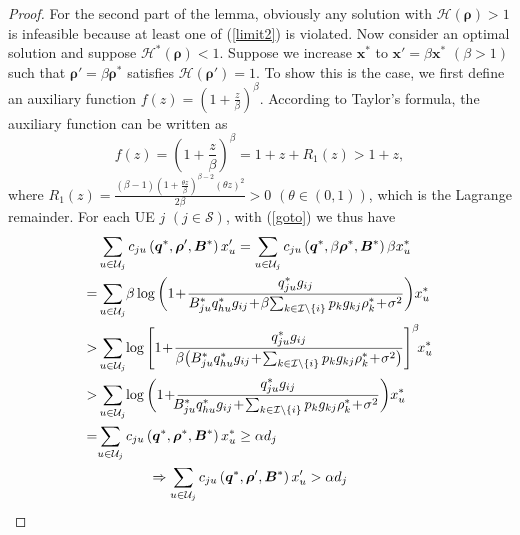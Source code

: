 \documentclass[10pt,journal,final,finalsubmission,twocolumn]{IEEEtran}
\begin{document}
\begin{proof}
For the second part of the lemma, obviously any solution with $\mathcal{H}(\boldsymbol{\rho}) > 1$ is infeasible because at least one of (\ref{limit2}) is violated. Now consider an optimal solution and suppose $\mathcal{H^*}(\boldsymbol{\rho}) < 1$. Suppose we increase $\boldsymbol{x}^*$ to $\boldsymbol{x}' =\beta\boldsymbol{x}^*$ $(\beta >1)$ such that $\boldsymbol{\rho}' =\beta\boldsymbol{\rho}^*$ satisfies $\mathcal{H}(\boldsymbol{\rho}') =1$. To show this is the case, we first define an auxiliary function $f(z) = (1+\frac{z}{\beta})^\beta$. According to Taylor's formula, the auxiliary function can be written as
\begin{equation}\label{goto}
f(z) =(1+\frac{z}{\beta})^\beta=1+z+R_1(z)>1+z,
\end{equation}
where $R_1(z)=\frac {(\beta-1)(1+\frac{\theta z}{\beta})^{\beta-2}(\theta z)^2}{2\beta}>0$ $(\theta \in (0,1))$, which is the Lagrange remainder. For each UE $j$ $(j\in \mathcal{S})$, with (\ref{goto}) we thus have
\begin{align}
&\sum\limits_{u\in \mathcal{U}_j} c_{ju}\left (\boldsymbol{q}^*,\boldsymbol{ \rho}', \boldsymbol{B}^*\right ) x_u'=\sum\limits_{u\in \mathcal{U}_j} c_{ju}\left (\boldsymbol{q}^*,\beta\boldsymbol{ \rho}^*, \boldsymbol{B}^*\right ) \beta x_u^*\notag\\
=&\sum\limits_{u\in \mathcal{U}_j}\!\beta\log \bigg ( 1\!+\!\frac{q_{ju}^*g_{ij}}{{B_{ju}^*q_{hu}^*g_{ij}}\!+\!\beta{\sum\nolimits_{ k\in \mathcal{I}\setminus \left \{ i \right \}}p_kg_{kj}\rho_k^*}\!+\!\sigma ^2} \bigg ) x_u^*\notag\\
>& \sum\limits_{u\in \mathcal{U}_j}\!\log \Bigg [ 1\!+\!\frac{q_{ju}^*g_{ij}}{\beta\big({B_{ju}^*q_{hu}^*g_{ij}}\!+\!{\sum\nolimits_{k\in \mathcal{I}\setminus \left \{ i \right \}}p_kg_{kj}\rho_k^*}\!+\!\sigma ^2\big)} \Bigg ]^\beta \!x_u^*\label{lemma1-1}\notag\\
>&\sum\limits_{u\in \mathcal{U}_j}\!\log \bigg ( 1\!+\!\frac{q_{ju}^*g_{ij}}{\!\!{B_{ju}^*q_{hu}^*g_{ij}}\!+\!{\sum\nolimits_{k\in \mathcal{I}\setminus \left \{ i \right \}}p_kg_{kj}\rho_k^*}\!+\!\sigma ^2} \bigg ) x_u^*\notag\\
=&\!\sum\limits_{u\in \mathcal{U}_j} c_{ju}\left (\boldsymbol{q}^*,\boldsymbol{ \rho}^*, \boldsymbol{B}^*\right )  x_u^*\geq\alpha d_j\notag\\
\ &\ \ \ \ \ \ \ \ \ \ \ \Rightarrow \sum\limits_{u\in \mathcal{U}_j} c_{ju}\left (\boldsymbol{q}^*,\boldsymbol{ \rho}', \boldsymbol{B}^*\right ) x_u'>\alpha d_j
\end{align}


\end{proof}
\end{document}
